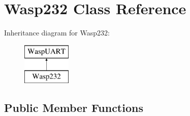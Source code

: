 \hypertarget{class_wasp232}{}\section{Wasp232 Class Reference}
\label{class_wasp232}
Inheritance diagram for Wasp232\+:\begin{figure}[H]
\begin{center}
\leavevmode
\includegraphics[height=2.000000cm]{class_wasp232}
\end{center}
\end{figure}
\subsection*{Public Member Functions}
